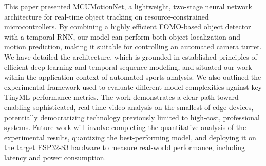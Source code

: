 \documentclass{article}
\begin{document}
This paper presented MCUMotionNet, a lightweight, two-stage neural network architecture for real-time object tracking on resource-constrained microcontrollers.
By combining a highly efficient FOMO-based object detector with a temporal RNN, our model can perform both object localization and motion prediction, making it suitable for controlling an automated camera turret.
We have detailed the architecture, which is grounded in established principles of efficient deep learning and temporal sequence modeling, and situated our work within the application context of automated sports analysis. We also outlined the experimental framework used to evaluate different model complexities against key TinyML performance metrics.
The work demonstrates a clear path toward enabling sophisticated, real-time video analysis on the smallest of edge devices, potentially democratizing technology previously limited to high-cost, professional systems.
Future work will involve completing the quantitative analysis of the experimental results, quantizing the best-performing model, and deploying it on the target ESP32-S3 hardware to measure real-world performance, including latency and power consumption.
\end{document}
